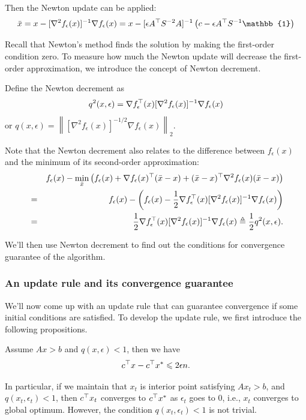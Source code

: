 Then the Newton update can be applied:
\begin{equation}
\bar{x}=x-[\nabla^2f_\epsilon(x)]^{-1}\nabla f_\epsilon(x)=x-[\epsilon A^\trans S^{-2}A]^{-1}\left(c-\epsilon A^\trans S^{-1}\mathbb{1}\right)\label{eq:Newton_update}
\end{equation}

Recall that Newton's method finds the solution by making the first-order condition zero. To measure how much the Newton update will decrease the first-order approximation, we introduce the concept of Newton decrement.

Define the Newton decrement as
\begin{equation}
q^2(x, \epsilon) = \nabla f^\top_\epsilon(x)[\nabla^2f_\epsilon(x)]^{-1}\nabla f_\epsilon(x)\label{eq:newton_decrement}
\end{equation}
or $q(x, \epsilon) = \left\|[\nabla^2f_\epsilon(x)]^{-1/2}\nabla f_\epsilon(x)\right\|_2$. 

Note that the Newton decrement also relates to the difference between $f_\epsilon(x)$ and the minimum of its second-order approximation:
\begin{eqnarray}
&&f_\epsilon(x)-\min_{\bar{x}}\left(f_\epsilon(x)+\nabla f_\epsilon(x)^\top(\bar{x}-x)+(\bar{x}-x)^\top\nabla^2 f_\epsilon(x)(\bar{x}-x)\right)\nonumber\\
&=&f_\epsilon(x)-\left(f_\epsilon(x)-\dfrac{1}{2}\nabla f^\top_\epsilon(x)[\nabla^2f_\epsilon(x)]^{-1}\nabla f_\epsilon(x)\right)\nonumber\\
&=&\dfrac{1}{2}\nabla f^\top_\epsilon(x)[\nabla^2f_\epsilon(x)]^{-1}\nabla f_\epsilon(x)\triangleq \dfrac{1}{2}q^2(x, \epsilon).
\end{eqnarray}

We'll then use Newton decrement to find out the conditions for convergence
guarantee of the algorithm. 

\subsubsection{An update rule and its convergence guarantee}
We'll now come up with an update rule that can guarantee convergence if some initial conditions are satisfied. To develop the update rule, we first introduce the following propositions. 
\begin{proposition}\label{prop1}
Assume $Ax > b$ and $q(x, \epsilon)<1$, then we have
\begin{align}
c^\top x-c^\top x^{*}\leqslant 2\epsilon n.
\end{align}
\end{proposition}
In particular, if we maintain that $x_t$ is interior point satisfying $Ax_t>b$,
and $q(x_t, \epsilon_t) < 1$, then $c^\top x_t$ converges to $c^\top x^*$ as $\epsilon_t$ goes to $0$, i.e., $x_t$ converges to global optimum. However, the condition $q(x_t,\epsilon_t)<1$ is not trivial.  

